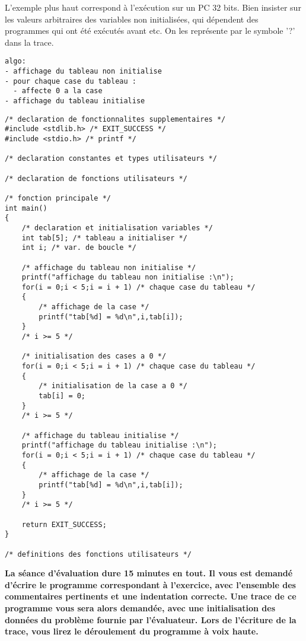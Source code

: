 \begin{correction}
L'exemple plus haut correspond à l'exécution sur un PC 32 bits. Bien insister sur les valeurs arbitraires des variables non initialisées, qui dépendent des programmes qui ont été exécutés avant etc. On les représente par le symbole '?' dans la trace.

\begin{verbatim}
algo:
- affichage du tableau non initialise
- pour chaque case du tableau :
  - affecte 0 a la case
- affichage du tableau initialise

\end{verbatim}
\begin{verbatim}
/* declaration de fonctionnalites supplementaires */
#include <stdlib.h> /* EXIT_SUCCESS */
#include <stdio.h> /* printf */

/* declaration constantes et types utilisateurs */

/* declaration de fonctions utilisateurs */

/* fonction principale */
int main()
{
    /* declaration et initialisation variables */
    int tab[5]; /* tableau a initialiser */
    int i; /* var. de boucle */

    /* affichage du tableau non initialise */
    printf("affichage du tableau non initialise :\n");
    for(i = 0;i < 5;i = i + 1) /* chaque case du tableau */
    {
        /* affichage de la case */
        printf("tab[%d] = %d\n",i,tab[i]);
    }
    /* i >= 5 */

    /* initialisation des cases a 0 */
    for(i = 0;i < 5;i = i + 1) /* chaque case du tableau */
    {
        /* initialisation de la case a 0 */
        tab[i] = 0;
    }
    /* i >= 5 */

    /* affichage du tableau initialise */
    printf("affichage du tableau initialise :\n");
    for(i = 0;i < 5;i = i + 1) /* chaque case du tableau */
    {
        /* affichage de la case */
        printf("tab[%d] = %d\n",i,tab[i]);
    }
    /* i >= 5 */

    return EXIT_SUCCESS;
}

/* definitions des fonctions utilisateurs */

\end{verbatim}
\end{correction}

\newpage
\textbf{La séance d'évaluation dure 15 minutes en tout. Il vous est demandé d'écrire le programme correspondant à l'exercice, avec l'ensemble des commentaires pertinents et une indentation correcte. Une trace de ce programme vous sera alors demandée, avec une initialisation des données du problème fournie par l'évaluateur. Lors de l'écriture de la trace, vous lirez le déroulement du programme à voix haute.}

